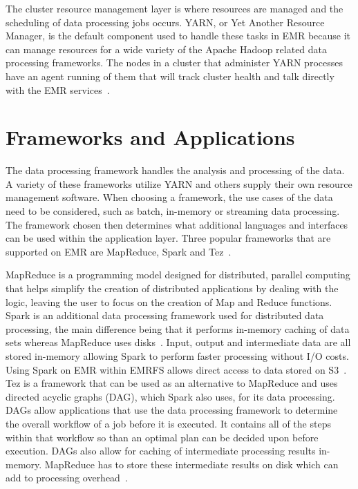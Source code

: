 The cluster resource management layer is where resources are managed and the
 scheduling of data processing jobs occurs. YARN, or Yet Another Resource 
Manager, is the default component used to handle these tasks in EMR because
 it can manage resources for a wide variety of the Apache Hadoop related data 
processing frameworks. The nodes in a cluster that administer YARN processes 
have an agent running of them that will track cluster health and talk directly 
with the EMR services~\cite{hid-sp18-521-amazonemr-arch}. 

\section{Frameworks and Applications}

The data processing framework handles the analysis and processing of the data. 
A variety of these frameworks utilize YARN and others supply their own 
resource management software. When choosing a framework, the use cases of the 
data need to be considered, such as batch, in-memory or streaming data 
processing. The framework chosen then determines what additional languages and 
interfaces can be used within the application layer. Three popular frameworks 
that are supported on EMR are MapReduce, Spark and 
Tez~\cite{hid-sp18-521-amazonemr-arch}. 

MapReduce is a programming model designed for distributed, parallel computing 
that helps simplify the creation of distributed applications by dealing with 
the logic, leaving the user to focus on the creation of Map and Reduce 
functions. Spark is an additional data processing framework used for 
distributed data processing, the main difference being that it performs 
in-memory caching of data sets whereas MapReduce uses 
disks~\cite{hid-sp18-521-amazonemr-arch}. Input, output and intermediate data 
are all stored in-memory allowing Spark to perform faster processing without 
I/O costs. Using Spark on EMR within EMRFS allows direct access to data stored 
on S3~\cite{hid-sp18-521-amazonemr-spark}. Tez is a framework that can be used 
as an alternative to MapReduce and uses directed acyclic graphs (DAG), which 
Spark also uses, for its data processing. DAGs allow applications that use the 
data processing framework to determine the overall workflow of a job before 
it is executed. It contains all of the steps within that workflow so than an 
optimal plan can be decided upon before execution. DAGs also allow for caching 
of intermediate processing results in-memory. MapReduce has to store these 
intermediate results on disk which can add to processing 
	overhead~\cite{hid-sp18-521-amazonemr-tez}. 

